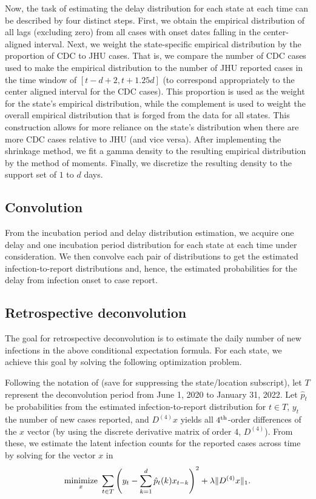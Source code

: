 \documentclass{article}
\begin{document}
Now, the task of estimating the delay distribution for each state at each time
can be described by four distinct steps. First, we obtain the empirical
distribution of all lags (excluding zero) from all cases with onset dates
falling in the center-aligned interval. Next, we weight the state-specific
empirical distribution by the proportion of CDC to JHU cases. That is, we
compare the number of CDC cases used to make the empirical distribution to the
number of JHU reported cases in the time window of $\left[t - d + 2, t +
1.25d\right]$ (to correspond appropriately to the center aligned interval for
the CDC cases). This proportion is used as the weight for the state’s empirical
distribution, while the complement is used to weight the overall empirical
distribution that is forged from the data for all states. This construction
allows for more reliance on the state's distribution when there are more CDC
cases relative to JHU (and vice versa). After implementing the shrinkage method,
we fit a gamma density to the resulting empirical distribution by the method of
moments. Finally, we discretize the resulting density to the support set of $1$
to $d$ days.
 
\subsection{Convolution} 

From the incubation period and delay distribution estimation, we acquire one
delay and one incubation period distribution for each state at each time under
consideration. We then convolve each pair of distributions to get the estimated
infection-to-report distributions and, hence, the estimated probabilities for
the delay from infection onset to case report. 

\subsection{Retrospective deconvolution}

The goal for retrospective deconvolution is to estimate the daily number of new
infections in the above conditional expectation formula. For each state, we
achieve this goal by solving the following optimization problem. 

Following the notation of \citet{jahja2022real} (save for suppressing the
state/location subscript), let $T$ represent the deconvolution period from June
1, 2020 to January 31, 2022. Let $\hat{p}_t$ be probabilities from the estimated
infection-to-report distribution for $t \in T$, $y_t$ the number of new cases
reported, and $D^{(4)}x$ yields all $4^{\textnormal{th}}$-order differences of the $x$ vector
(by using the discrete derivative matrix of order 4, $D^{(4)}$). From these,
we estimate the latent infection counts for the reported cases across time by
solving for the vector $x$ in
\begin{align*}
\operatorname*{minimize}_{x}\ \sum_{t \in T} \left ( y_t -  \sum_{k = 1}^{d} \hat{p}_t(k)x_{t-k} 
\right )^2 + \lambda \|D^{(4)}x\|_1. 
\end{align*}
\end{document}
